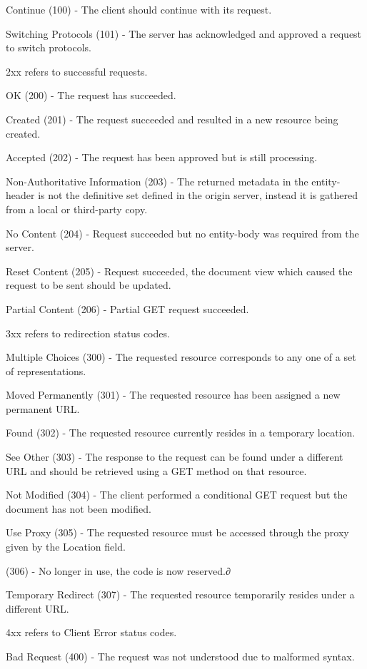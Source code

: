 \documentclass[12pt]{article}
\begin{document}
Continue (100) - The client should continue with its request.

Switching Protocols (101) - The server has acknowledged and approved a request to switch protocols.

2xx refers to successful requests.

OK (200) - The request has succeeded.

Created (201) - The request succeeded and resulted in a new resource being created.

Accepted (202) - The request has been approved but is still processing.

Non-Authoritative Information (203) - The returned metadata in the entity-header is not the definitive set defined in the origin server, instead it is gathered from a local or third-party copy.

No Content (204) - Request succeeded but no entity-body was required from the server.

Reset Content (205) - Request succeeded, the document view which caused the request to be sent should be updated.

Partial Content (206) - Partial GET request succeeded.

3xx refers to redirection status codes.

Multiple Choices (300) - The requested resource corresponds to any one of a set of representations.

Moved Permanently (301) - The requested resource has been assigned a new permanent URL.

Found (302) - The requested resource currently resides in a temporary location.

See Other (303) - The response to the request can be found under a different URL and should be retrieved using a GET method on that resource.

Not Modified (304) - The client performed a conditional GET request but the document has not been modified.

Use Proxy (305) - The requested resource must be accessed through the proxy given by the Location field.

(306) - No longer in use, the code is now reserved.∂

Temporary Redirect (307) - The requested resource temporarily resides under a different URL.

4xx refers to Client Error status codes.

Bad Request (400) - The request was not understood due to malformed syntax.
\end{document}
